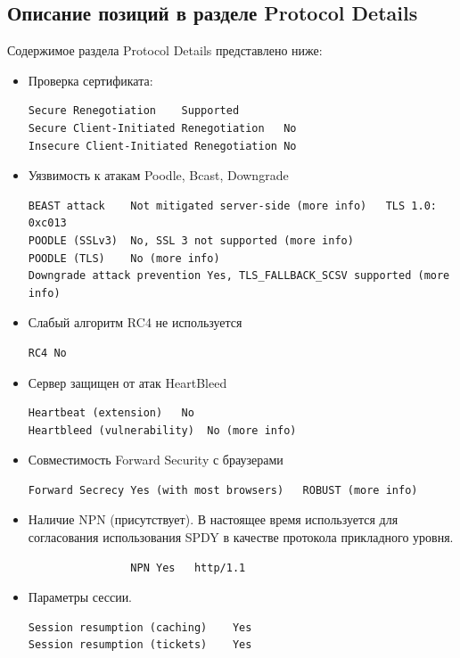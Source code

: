 \documentclass[10pt,a4paper]{report}
\begin{document}
		\subsection{Описание позиций в разделе Protocol Details}
			Содержимое раздела Protocol Details представлено ниже:
			\begin{itemize}
				\item Проверка сертификата:
				\begin{lstlisting}
Secure Renegotiation	Supported
Secure Client-Initiated Renegotiation	No
Insecure Client-Initiated Renegotiation	No
				\end{lstlisting}
				
				\item Уязвимость к атакам Poodle, Bcast, Downgrade
				\begin{lstlisting}
BEAST attack	Not mitigated server-side (more info)   TLS 1.0: 0xc013
POODLE (SSLv3)	No, SSL 3 not supported (more info)
POODLE (TLS)	No (more info)
Downgrade attack prevention	Yes, TLS_FALLBACK_SCSV supported (more info)
				\end{lstlisting}
				
				\item Слабый алгоритм RC4 не используется
				\begin{lstlisting}
RC4	No
				\end{lstlisting}
				
				\item Сервер защищен от атак HeartBleed
				\begin{lstlisting}
Heartbeat (extension)	No
Heartbleed (vulnerability)	No (more info)
				\end{lstlisting}
				
				\item Совместимость Forward Security с браузерами
				\begin{lstlisting}
Forward Secrecy	Yes (with most browsers)   ROBUST (more info)
				\end{lstlisting}
				
				\item Наличие NPN (присутствует).
				В настоящее время используется для согласования использования SPDY в 
				качестве протокола прикладного уровня.
				\begin{lstlisting}
				NPN	Yes   http/1.1
				\end{lstlisting}
				
				\item Параметры сессии.
				\begin{lstlisting}
Session resumption (caching)	Yes
Session resumption (tickets)	Yes
				\end{lstlisting}
				

\end{itemize}
\end{document}
